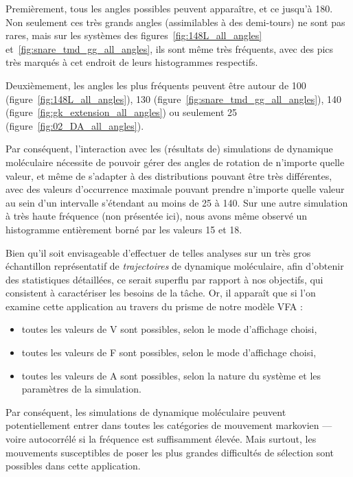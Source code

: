 	Premièrement, tous les angles possibles peuvent apparaître, et ce jusqu'à 180\textdegree{}. Non seulement ces très grands angles (assimilables à des demi-tours) ne sont pas rares, mais sur les systèmes des figures~\ref{fig:148L_all_angles} et~\ref{fig:snare_tmd_gg_all_angles}, ils sont même très fréquents, avec des pics très marqués à cet endroit de leurs histogrammes respectifs.
	
	Deuxièmement, les angles les plus fréquents peuvent être autour de 100\textdegree{} (figure~\ref{fig:148L_all_angles}), 130\textdegree{} (figure~\ref{fig:snare_tmd_gg_all_angles}), 140\textdegree{} (figure~\ref{fig:gk_extension_all_angles}) ou seulement 25\textdegree{} (figure~\ref{fig:02_DA_all_angles}).
	
	Par conséquent, l'interaction avec les (résultats de) simulations de dynamique moléculaire nécessite de pouvoir gérer des angles de rotation de n'importe quelle valeur, et même de s'adapter à des distributions pouvant être très différentes, avec des valeurs d'occurrence maximale pouvant prendre n'importe quelle valeur au sein d'un intervalle s'étendant au moins de 25\textdegree{} à 140\textdegree{}. Sur une autre simulation à très haute fréquence (non présentée ici), nous avons même observé un histogramme entièrement borné par les valeurs 15\textdegree{} et 18\textdegree{}.
	
	Bien qu'il soit envisageable d'effectuer de telles analyses sur un très gros échantillon représentatif de \emph{trajectoires} de dynamique moléculaire, afin d'obtenir des statistiques détaillées, ce serait superflu par rapport à nos objectifs, qui consistent à caractériser les besoins de la tâche. Or, il apparaît que si l'on examine cette application au travers du prisme de notre modèle VFA :
	
	\begin{itemize}
		\item toutes les valeurs de V sont possibles, selon le mode d'affichage choisi,
		\item toutes les valeurs de F sont possibles, selon le mode d'affichage choisi,
		\item toutes les valeurs de A sont possibles, selon la nature du système et les paramètres de la simulation.
	\end{itemize}
	
	Par conséquent, les simulations de dynamique moléculaire peuvent potentiellement entrer dans toutes les catégories de mouvement markovien --- voire autocorrélé si la fréquence est suffisamment élevée. Mais surtout, les mouvements susceptibles de poser les plus grandes difficultés de sélection sont possibles dans cette application.
	
